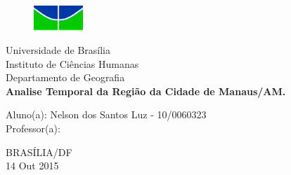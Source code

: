 \begin{titlepage}
\begin{center}
\begin{figure}[!htpb]
        \centering
        \includegraphics[width=5em]{logo/logoUnB.jpg}
\end{figure}
{\large Universidade de Brasília}\\[0.2cm]
{\large Instituto de Ciências Humanas}\\[0.2cm]
{\large Departamento de Geografia}\\[4.1cm]
{\bf \huge  Analise Temporal da Região da Cidade de Manaus/AM.}\\[4.1cm]
\end{center}
{\large Aluno(a): Nelson dos Santos Luz - 10/0060323}\\[0.7cm]
{\large Professor(a): }\\[4.1cm]
\begin{center}
{\large BRASÍLIA/DF}\\[0.2cm]
{\large 14 Out 2015}
\end{center}
\end{titlepage}